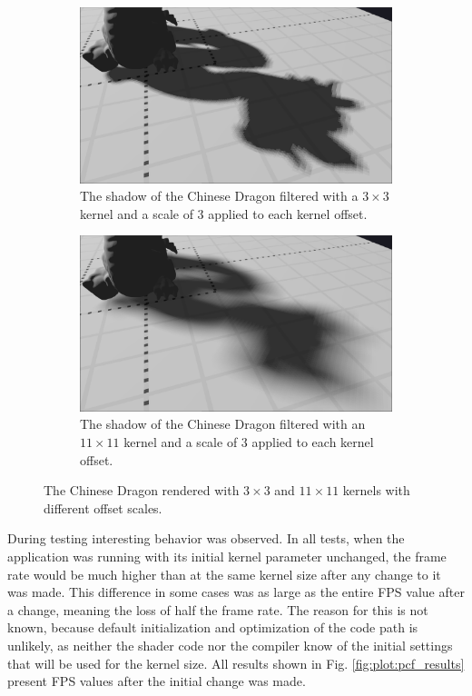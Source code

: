 \begin{figure}[p]
    \begin{subfigure}[t]{0.48\textwidth}
		\centering
        \includegraphics[width=\textwidth]{./graf/tests/pcf/cropped/dragon_pcf_fhd_1024_3x3_offset3.png}
        \caption{The shadow of the Chinese Dragon filtered with a \(3\times 3\) kernel and a scale of \(3\) applied to each kernel offset.}
    \end{subfigure}
	\hfill
    \begin{subfigure}[t]{0.48\textwidth}
		\centering
        \includegraphics[width=\textwidth]{./graf/tests/pcf/cropped/dragon_pcf_fhd_1024_11x11_offset3.png}
        \caption{The shadow of the Chinese Dragon filtered with an \(11\times 11\) kernel and a scale of \(3\) applied to each kernel offset.}
    \end{subfigure}    

    \caption{The Chinese Dragon rendered with \(3\times 3\) and \(11\times 11\) kernels with different offset scales.}
    \label{fig:test_pcf_dragon_screens}
\end{figure}

During testing interesting behavior was observed. In all tests, when the application was running with its initial kernel parameter unchanged, the frame rate would be much higher than at the same kernel size after any change to it was made. This difference in some cases was as large as the entire FPS value after a change, meaning the loss of half the frame rate. The reason for this is not known, because default initialization and optimization of the code path is unlikely, as neither the shader code nor the compiler know of the initial settings that will be used for the kernel size. All results shown in Fig. \ref{fig:plot:pcf_results} present FPS values after the initial change was made.

